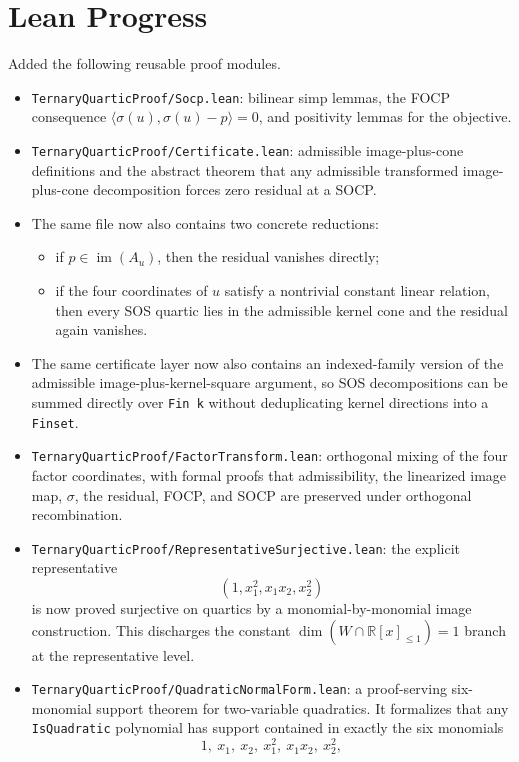 \documentclass[11pt]{article}
\begin{document}
\section*{Lean Progress}
Added the following reusable proof modules.
\begin{itemize}
\item \texttt{TernaryQuarticProof/Socp.lean}: bilinear simp lemmas, the FOCP
consequence $\langle \sigma(u), \sigma(u)-p \rangle = 0$, and positivity lemmas
for the objective.
\item \texttt{TernaryQuarticProof/Certificate.lean}: admissible
image-plus-cone definitions and the abstract theorem that any admissible
transformed image-plus-cone decomposition forces zero residual at a SOCP.
\item The same file now also contains two concrete reductions:
  \begin{itemize}
  \item if $p \in \operatorname{im}(A_u)$, then the residual vanishes directly;
  \item if the four coordinates of $u$ satisfy a nontrivial constant linear
  relation, then every SOS quartic lies in the admissible kernel cone and the
  residual again vanishes.
  \end{itemize}
\item The same certificate layer now also contains an indexed-family version of
  the admissible image-plus-kernel-square argument, so SOS decompositions can
  be summed directly over \texttt{Fin k} without deduplicating kernel
  directions into a \texttt{Finset}.
\item \texttt{TernaryQuarticProof/FactorTransform.lean}: orthogonal mixing of
  the four factor coordinates, with formal proofs that admissibility, the
  linearized image map, $\sigma$, the residual, FOCP, and SOCP are preserved
  under orthogonal recombination.
\item \texttt{TernaryQuarticProof/RepresentativeSurjective.lean}: the explicit
  representative
  \[
    (1, x_1^2, x_1x_2, x_2^2)
  \]
  is now proved surjective on quartics by a monomial-by-monomial image
  construction. This discharges the constant $\dim(W \cap \mathbb{R}[x]_{\le 1})
  = 1$ branch at the representative level.
\item \texttt{TernaryQuarticProof/QuadraticNormalForm.lean}: a proof-serving
  six-monomial support theorem for two-variable quadratics. It formalizes that
  any \texttt{IsQuadratic} polynomial has support contained in exactly the six
  monomials
  \[
    1,\ x_1,\ x_2,\ x_1^2,\ x_1x_2,\ x_2^2,
\]
\end{itemize}
\end{document}
